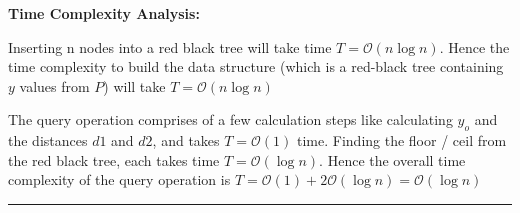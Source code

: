 \documentclass[10pt, a4paper]{article}
\newcommand{\BigO}{\mathcal{O}}
\begin{document}
\textbf{Time Complexity Analysis:}

Inserting n nodes into a red black tree will take time $T = \BigO(n\log n)$. Hence the time complexity to build the data structure (which is a red-black tree containing $y$ values from $P$) will take $T = \BigO(n\log n)$

The query operation comprises of a few calculation steps like calculating $y_o$ and the distances $d1$ and $d2$, and takes $T = \BigO(1)$ time. Finding the floor / ceil from the red black tree, each takes time $T = \BigO(\log n)$. Hence the overall time complexity of the query operation is $T = \BigO(1) + 2\BigO(\log n) = \BigO(\log n)$

\rule{\textwidth}{0.8pt}
\end{document}
